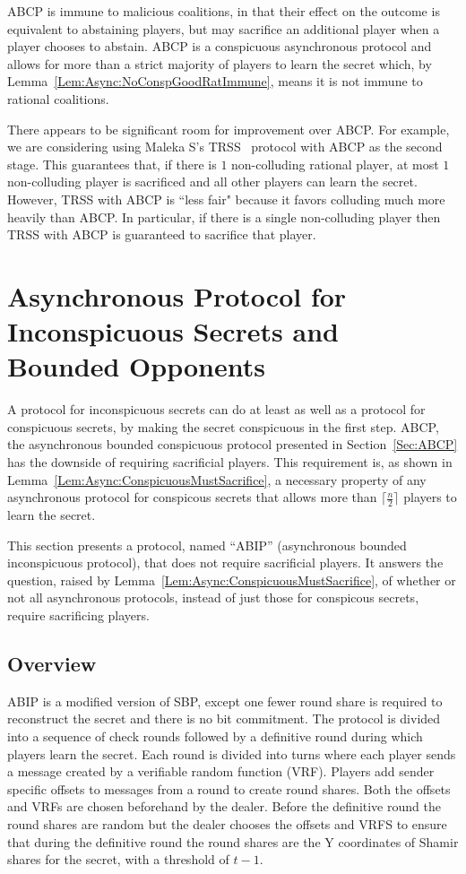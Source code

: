 \documentclass{dalcsthesis}
\begin{document}
ABCP is immune to malicious coalitions, in that their effect on the outcome is equivalent to abstaining players, but may sacrifice an additional player when a player chooses to abstain. ABCP is a conspicuous asynchronous protocol and allows for more than a strict majority of players to learn the secret which, by Lemma~\ref{Lem:Async:NoConspGoodRatImmune}, means it is not immune to rational coalitions.

There appears to be significant room for improvement over ABCP. For example, we are considering using Maleka S's TRSS~\cite{MalekaS_08} protocol with ABCP as the second stage. This guarantees that, if there is $1$ non-colluding rational player, at most $1$ non-colluding player is sacrificed and all other players can learn the secret. However, TRSS with ABCP is ``less fair" because it favors colluding much more heavily than ABCP. In particular, if there is a single non-colluding player then TRSS with ABCP is guaranteed to sacrifice that player.



\section{Asynchronous Protocol for Inconspicuous Secrets and Bounded Opponents}
\label{Sec:ABIP}

A protocol for inconspicuous secrets can do at least as well as a protocol for conspicuous secrets, by making the secret conspicuous in the first step. ABCP, the asynchronous bounded conspicuous protocol presented in Section~\ref{Sec:ABCP} has the downside of requiring sacrificial players. This requirement is, as shown in Lemma~\ref{Lem:Async:ConspicuousMustSacrifice}, a necessary property of any asynchronous protocol for conspicous secrets that allows more than $\lceil \frac{n}{2} \rceil$ players to learn the secret.

This section presents a protocol, named ``ABIP'' (asynchronous bounded inconspicuous protocol), that does not require sacrificial players. It answers the question, raised by Lemma~\ref{Lem:Async:ConspicuousMustSacrifice}, of whether or not all asynchronous protocols, instead of just those for conspicous secrets, require sacrificing players.


\subsection{Overview}

ABIP is a modified version of SBP, except one fewer round share is required to reconstruct the secret and there is no bit commitment. The protocol is divided into a sequence of check rounds followed by a definitive round during which players learn the secret. Each round is divided into turns where each player sends a message created by a verifiable random function (VRF). Players add sender specific offsets to messages from a round to create round shares. Both the offsets and VRFs are chosen beforehand by the dealer. Before the definitive round the round shares are random but the dealer chooses the offsets and VRFS to ensure that during the definitive round the round shares are the Y coordinates of Shamir shares for the secret, with a threshold of $t-1$.
\end{document}
